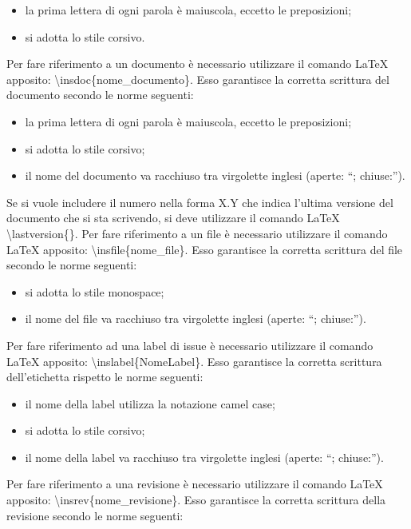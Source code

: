 						\begin{itemize}
							\item la prima lettera di ogni parola è maiuscola, eccetto le preposizioni;
							\item si adotta lo stile corsivo.
						\end{itemize}
						Per fare riferimento a un documento è necessario utilizzare il comando \LaTeX{} apposito: \textbackslash insdoc\{nome\_documento\}. Esso garantisce la corretta scrittura del documento secondo le norme seguenti:
						\begin{itemize}
							\item la prima lettera di ogni parola è maiuscola, eccetto le preposizioni;
							\item si adotta lo stile corsivo;
							\item il nome del documento va racchiuso tra virgolette inglesi (aperte: “; chiuse:”).
						\end{itemize}
						Se si vuole includere il numero nella forma X.Y che indica l’ultima versione del documento che si sta scrivendo, si deve utilizzare il comando \LaTeX{} \textbackslash lastversion\{\}.
						Per fare riferimento a un file è necessario utilizzare il comando \LaTeX{} apposito: \textbackslash insfile\{nome\_file\}. Esso garantisce la corretta scrittura del file secondo le norme seguenti:
						\begin{itemize}
							\item si adotta lo stile monospace;
							\item il nome del file va racchiuso tra virgolette inglesi (aperte: “; chiuse:”).
						\end{itemize}
					 \label{sec:sintassiissue}
						Per fare riferimento ad una label di issue è necessario utilizzare il comando \LaTeX{} apposito: \textbackslash inslabel\{NomeLabel\}. Esso garantisce la corretta scrittura dell'etichetta rispetto le norme seguenti:
						\begin{itemize}
							\item il nome della label utilizza la notazione camel case;
							\item si adotta lo stile corsivo;
							\item il nome della label va racchiuso tra virgolette inglesi (aperte: “; chiuse:”).
						\end{itemize}
						Per fare riferimento a una revisione è necessario utilizzare il comando \LaTeX{} apposito: \textbackslash insrev\{nome\_revisione\}. Esso garantisce la corretta scrittura della revisione secondo le norme seguenti:
